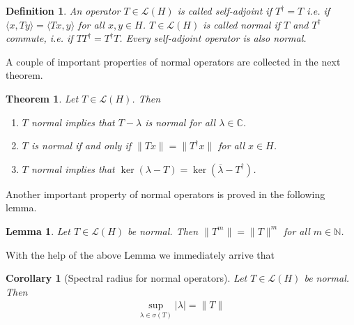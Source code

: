 \documentclass[11pt,a4paper]{article}
\newtheorem{lem}{Lemma}[section]
\newtheorem{thm}{Theorem}[section]
\newtheorem{cor}{Corollary}[section]
\newtheorem{defn}{Definition}[section]
\theoremstyle{definition}
\begin{document}
\begin{defn} An operator $T \in \mathcal{L}(H)$ is called self-adjoint if $T^\dag = T$ i.e. if $\langle x,Ty \rangle = \langle Tx, y \rangle$ for all $x,y \in H$. $T \in \mathcal{L}(H)$ is called normal if $T$ and $T^\dag$ commute, i.e. if $TT^\dag = T^\dag T$. Every self-adjoint operator is also normal. 
\end{defn}
\noindent A couple of important properties of normal operators are collected in the next theorem.
\begin{thm} Let $T \in \mathcal{L}(H)$. Then 
\begin{enumerate}
\item $T$ normal implies that $T- \lambda$ is normal for all $\lambda \in \mathbb{C}$.
\item $T$ is normal if and only if $\|Tx\| = \|T^\dag x \| $ for all $x \in H$.
\item $T$ normal implies that $\ker( \lambda-T) = \ker ( \overline{\lambda}-T^\dag)$. 
\end{enumerate}
\end{thm}
\noindent Another important property of normal operators is proved in the following lemma.
\begin{lem} Let $T \in \mathcal{L}(H)$ be normal. Then $\|T^m \| = \|T\|^m$ for all $m \in \mathbb{N}$. 
\end{lem}
\noindent With the help of the above Lemma we immediately arrive that 
\begin{cor}[Spectral radius for normal operators] Let $T \in \mathcal{L}(H)$ be normal. Then 
\begin{align*}
\sup_{ \lambda \in \sigma(T)} | \lambda| = \|T\|
\end{align*}
\end{cor}
\newpage 
\end{document}
